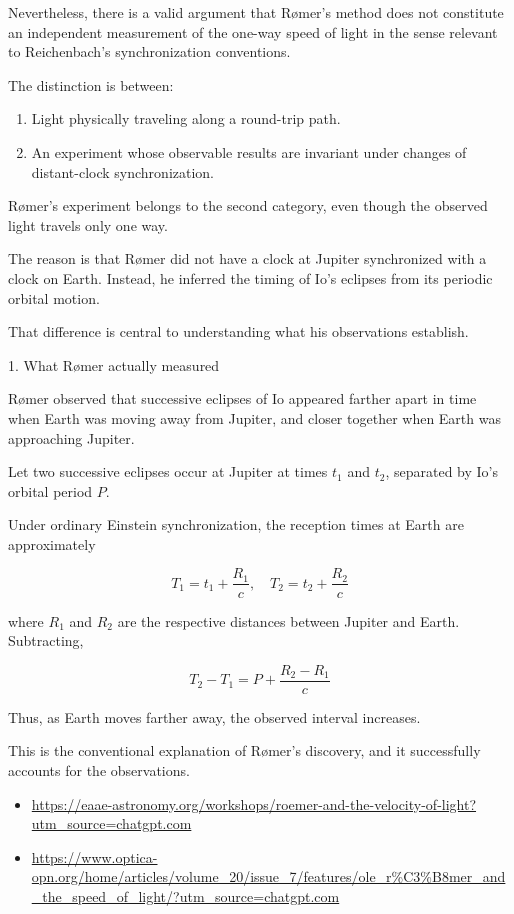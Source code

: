 \documentclass[a4paper]{article}
\theoremstyle{plain}
\theoremstyle{definition}
\begin{document}
Nevertheless, there is a valid argument that R\o{}mer's method does
not constitute an independent measurement of the one-way speed of
light in the sense relevant to Reichenbach's synchronization
conventions.

The distinction is between:

\begin{enumerate}
\item Light physically traveling along a round-trip path.
\item An experiment whose observable results are invariant under
  changes of distant-clock synchronization.
\end{enumerate}

R\o{}mer's experiment belongs to the second category, even though the
observed light travels only one way.

The reason is that R\o{}mer did not have a clock at Jupiter
synchronized with a clock on Earth.  Instead, he inferred the timing
of Io's eclipses from its periodic orbital motion.

That difference is central to understanding what his observations
establish.

1. What R\o{}mer actually measured

R\o{}mer observed that successive eclipses of Io appeared farther
apart in time when Earth was moving away from Jupiter, and closer
together when Earth was approaching Jupiter.

Let two successive eclipses occur at Jupiter at times $t_1$ and $t_2$,
separated by Io's orbital period $P$.

Under ordinary Einstein synchronization, the reception times at Earth
are approximately

\begin{equation}
T_1 = t_1 + \frac{R_1}{c}, \quad
T_2 = t_2 + \frac{R_2}{c}
\end{equation}

where $R_1$ and $R_2$ are the respective distances between Jupiter and
Earth.  Subtracting,

\begin{equation}
T_2 - T_1 = P + \frac{R_2 - R_1}{c}
\end{equation}

Thus, as Earth moves farther away, the observed interval increases.

This is the conventional explanation of R\o{}mer's discovery, and it
successfully accounts for the observations.

\begin{itemize}
\item \url{https://eaae-astronomy.org/workshops/roemer-and-the-velocity-of-light?utm_source=chatgpt.com}
\item \url{https://www.optica-opn.org/home/articles/volume_20/issue_7/features/ole_r%C3%B8mer_and_the_speed_of_light/?utm_source=chatgpt.com}
\end{itemize}
\end{document}
